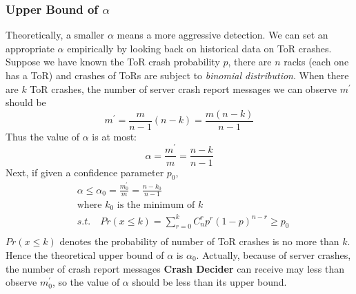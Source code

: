 \documentclass{sig-alternate-05-2015}
\begin{document}
\subsubsection*{Upper Bound of $\alpha$}
Theoretically, a smaller $\alpha$ means a more aggressive detection. We can set an appropriate $\alpha$ empirically by looking back on historical data on ToR crashes. Suppose we have known the ToR crash probability $p$, there are $n$ racks (each one has a ToR) and crashes of ToRs are subject to \textit{binomial distribution}. When there are $k$ ToR crashes, the number of server crash report messages we can observe $m^\prime$ should be
\begin{equation}
    m^\prime  = \frac{m}{n-1}(n-k) = \frac{m(n-k)}{n-1}
\end{equation}
Thus the value of $\alpha$ is at most:
\begin{equation}
    \alpha  = \frac{m^\prime}{m} = \frac{n-k}{n-1}
\end{equation}
Next, if given a confidence parameter $p_0$,
\begin{equation}
    \begin{aligned}
        &\alpha \leq \alpha_0  = \frac{m_0^\prime}{m} = \frac{n-k_0}{n-1}\\
        &\text{where } k_0 \text{ is the minimum of } k\\
        & s.t. \quad Pr(x\leq k) = \sum_{r=0}^k C_n^r p^r(1-p)^{n-r} \geq p_0 \\
    \end{aligned}
\end{equation}
$Pr(x\leq k)$ denotes the probability of number of ToR crashes is no more than $k$. Hence the theoretical upper bound of $\alpha$ is $\alpha_0$. Actually, because of server crashes, the number of crash report messages \textbf{Crash Decider} can receive may less than observe $m_0^\prime$, so the value of $\alpha$ should be less than its upper bound.
\end{document}
